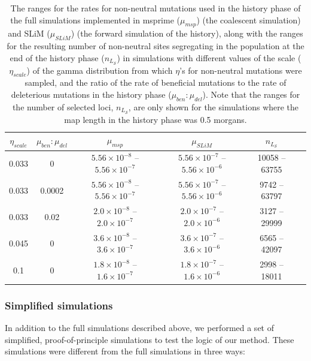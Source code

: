\documentclass[12pt]{article}
\begin{document}
\begin{bibunit}
\begin{table}
    \centering
    \begin{tabular}{|c|c|c|c|c|c|}
    \hline
        $\eta_{scale}$&$\mu_{ben}:\mu_{del}$ &\textbf{$\mu_{msp}$}  &\textbf{$\mu_{SLiM}$}  & $n_{L_\mathcal{S}}$\\
        \hline
        0.033 & 0 & $5.56\times10^{-8}$ -- $5.56\times10^{-7}$ &$5.56\times10^{-7}$ --  $5.56\times10^{-6}$  & 10058  -- 63755\\
        0.033 & 0.0002 & $5.56\times10^{-8}$ --  $5.56\times10^{-7}$ & $5.56\times10^{-7}$ -- $5.56\times10^{-6}$ & 9742 -- 63797\\
         0.033 & 0.02  & $2.0\times10^{-8}$ -- $2.0\times10^{-7}$ & $2.0\times10^{-7}$ -- $2.0\times10^{-6}$ & 3127 --  29999\\
         0.045 & 0 & $3.6\times10^{-8}$ --  $3.6\times10^{-7}$ & $3.6\times10^{-7}$ --  $3.6\times10^{-6}$ & 6565 --  42097\\
         0.1 & 0 & $1.8\times10^{-8}$ -- $1.6\times10^{-7}$ & $1.8\times10^{-7}$ -- $1.6\times10^{-6}$ & 2998 --  18011 \\
         \hline
    \end{tabular}
    \caption{The ranges for the rates for non-neutral mutations used in the history phase of the full simulations implemented in msprime ($\mu_{msp}$) (the coalescent simulation) and SLiM ($\mu_{SLiM}$) (the forward simulation of the history), along with the ranges for the resulting number of non-neutral sites segregating in the population at the end of the history phase ($n_{L_\mathcal{S}}$) in simulations with different values of the scale ($\eta_{scale}$) of the gamma distribution from which $\eta$'s for non-neutral mutations were sampled, and the ratio of the rate of beneficial mutations to the rate of deleterious mutations in the history phase ($\mu_{ben}:\mu_{del}$). Note that the ranges for the number of selected loci, $n_{L_\mathcal{S}}$, are only shown for the simulations where the map length in the history phase was 0.5 morgans.}
    \label{tab:Table_1}
\end{table}

\subsubsection*{Simplified simulations}

In addition to the full simulations described above, we performed a set of simplified, proof-of-principle simulations to test the logic of our method. These simulations were different from the full simulations in three ways:


\end{bibunit}
\end{document}
